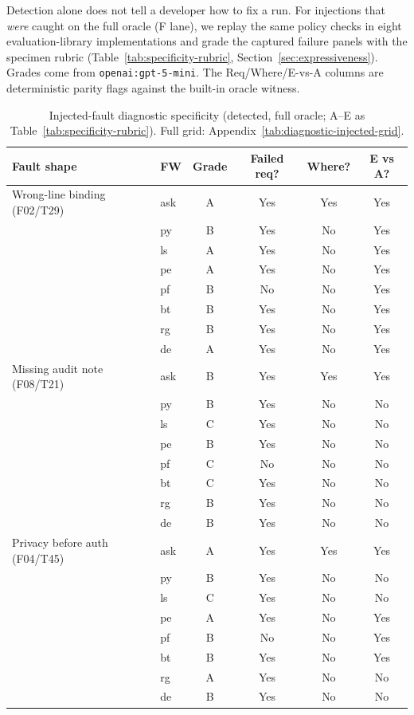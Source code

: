 Detection alone does not tell a developer how to fix a run. For injections that \emph{were} caught on the full oracle (F lane), we replay the same policy checks in eight evaluation-library implementations and grade the captured failure panels with the specimen rubric (Table~\ref{tab:specificity-rubric}, Section~\ref{sec:expressiveness}). Grades come from \texttt{openai:gpt-5-mini}. The Req/Where/E-vs-A columns are deterministic parity flags against the built-in oracle witness.

\begin{table}[H]
\centering
\caption{Injected-fault diagnostic specificity (detected, full oracle; A--E as Table~\ref{tab:specificity-rubric}). Full grid: Appendix~\ref{tab:diagnostic-injected-grid}.}
\label{tab:diagnostic-comparison}
\footnotesize
\begin{tabular}{@{}llcccc@{}}
\toprule
Fault shape & FW & Grade & Failed req? & Where? & E vs A? \\
\midrule
Wrong-line binding (F02/T29) & ask & A & Yes & Yes & Yes \\
 & py & B & Yes & No & Yes \\
 & ls & A & Yes & No & Yes \\
 & pe & A & Yes & No & Yes \\
 & pf & B & No & No & Yes \\
 & bt & B & Yes & No & Yes \\
 & rg & B & Yes & No & Yes \\
 & de & A & Yes & No & Yes \\
\addlinespace
Missing audit note (F08/T21) & ask & B & Yes & Yes & Yes \\
 & py & B & Yes & No & No \\
 & ls & C & Yes & No & No \\
 & pe & B & Yes & No & No \\
 & pf & C & No & No & No \\
 & bt & C & Yes & No & No \\
 & rg & B & Yes & No & No \\
 & de & B & Yes & No & No \\
\addlinespace
Privacy before auth (F04/T45) & ask & A & Yes & Yes & Yes \\
 & py & B & Yes & No & No \\
 & ls & C & Yes & No & No \\
 & pe & A & Yes & No & Yes \\
 & pf & B & No & No & Yes \\
 & bt & B & Yes & No & Yes \\
 & rg & A & Yes & No & No \\
 & de & B & Yes & No & No \\
\bottomrule
\end{tabular}
\end{table}

